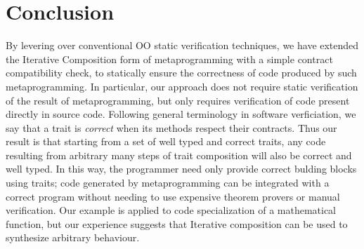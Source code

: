 \section{Conclusion}
By levering over conventional OO static verification techniques, we have extended the Iterative Composition form of metaprogramming with a simple contract compatibility check, to statically ensure the correctness of code produced by such metaprogramming. In particular, our approach does not require static verification of the result of metaprogramming, but only requires verification of code present directly in source code.
Following general terminology in software verficiation, we say that a trait is \emph{correct} when its methods respect their contracts.
Thus our result is that starting from a set
of well typed and correct traits, 
any code resulting from arbitrary many steps of trait composition will also be correct and well typed.
In this way, the programmer need only provide correct bulding blocks using traits;
code generated by metaprogramming can be integrated with a correct program without needing to use expensive theorem provers or manual verification.
Our example is applied to code specialization of a mathematical function, but our experience suggests that Iterative composition can be used to synthesize arbitrary behaviour.
